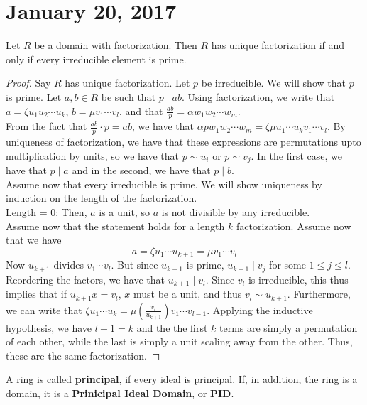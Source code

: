 \section{January 20, 2017}
\begin{prop} \label{Prop 1, Jan 20}
    Let $R$ be a domain with factorization. Then $R$ has unique factorization if and
    only if every irreducible element is prime.
\end{prop}
\begin{proof}
    Say $R$ has unique factorization. Let $p$ be irreducible. We will show that
    $p$ is prime. Let $a,b \in R$ be such that $p \mid ab$. Using factorization,
    we write that $a = \zeta u_1u_2 \cdots u_k$, $b = \mu v_1\cdots v_l$, and that
    $\frac{ab}{p} = \alpha w_1w_2 \cdots w_m$. \\
    From the fact that $\frac{ab}{p}\cdot p = ab$, we have that $\alpha p w_1w_2\cdots w_m = \zeta\mu u_1\cdots u_kv_1 \cdots v_l$.
    By uniqueness of factorization, we have that these expressions are permutations
    upto multiplication by units, so we have that $p \sim u_i$ or $p \sim v_j$. In
    the first case, we have that $p \mid a$ and in the second, we have that $p \mid b$. \\
    Assume now that every irreducible is prime. We will show uniqueness by induction
    on the length of the factorization. \\
    Length = 0: Then, $a$ is a unit, so $a$ is not divisible by any irreducible. \\
    Assume now that the statement holds for a length $k$ factorization.
    Assume now that we have
    $$
    a = \zeta u_1 \cdots u_{k+1} = \mu v_1 \cdots v_l
    $$
    Now $u_{k+1}$ divides $v_1 \cdots v_l$. But since $u_{k+1}$ is prime, $u_{k+1} \mid v_j$
    for some $1 \leq j \leq l$. Reordering the factors, we have that
    $u_{k+1} \mid v_l$. Since $v_l$ is irreducible, this thus implies that if $u_{k+1}x = v_l$,
    $x$ must be a unit, and thus $v_l \sim u_{k+1}$. Furthermore, we can write that
    $\zeta u_1 \cdots u_k = \mu \left(\frac{v_l}{u_{k+1}}\right) v_1 \cdots v_{l-1}$. Applying
    the inductive hypothesis, we have $l -1 = k$ and the the first $k$ terms
    are simply a permutation of each other, while the last is simply a unit scaling
    away from the other. Thus, these are the same factorization.
\end{proof}
\begin{defn} \label{Defn 2, Jan 20}
    A ring is called \textbf{principal}, if every ideal is principal. If,
    in addition, the ring is a domain, it is a \textbf{Prinicipal Ideal Domain}, or
    \textbf{PID}.
\end{defn}
